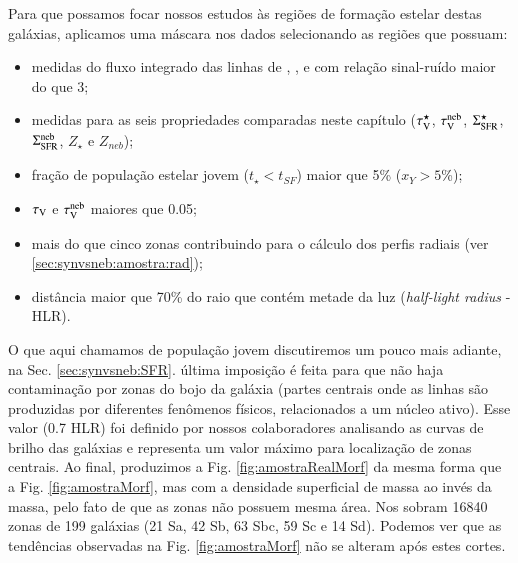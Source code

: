 Para que possamos focar nossos estudos às regiões de formação estelar destas galáxias, aplicamos uma
máscara nos dados selecionando as regiões que possuam:
\begin{itemize}
  \item medidas do fluxo integrado das linhas de \Halpha, \Hbeta, \nII e \oIII com relação
sinal-ruído maior do que 3;
  \item medidas para as seis propriedades comparadas neste capítulo ($\tau_{\mathrm{V}}^\star$, $\tau_{\mathrm{V}}^{\mathrm{neb}}$,
$\Sigma_{\mathrm{SFR}}^\star$, $\Sigma_{\mathrm{SFR}}^{\mathrm{neb}}$, $Z_\star$ e $Z_{neb}$);
  \item fração de população estelar jovem ($t_\star < t_{SF}$) maior que 5\% ($x_Y > 5$\%);
  \item $\tau_{\mathrm{V}}$ e $\tau_{\mathrm{V}}^{\mathrm{neb}}$ maiores que 0.05;
  \item mais do que cinco zonas contribuindo para o cálculo dos perfis radiais (ver
  \ref{sec:synvsneb:amostra:rad});
  \item distância maior que 70\% do raio que contém metade da luz ({\em half-light radius} - HLR).
\end{itemize}
\noindent O que aqui chamamos de população jovem discutiremos um pouco mais adiante, na Sec.
\ref{sec:synvsneb:SFR}. última imposição é feita para que não haja contaminação por zonas
do bojo da galáxia (partes centrais onde as linhas são produzidas por diferentes fenômenos físicos,
relacionados a um núcleo ativo). Esse valor (0.7 HLR) foi definido por nossos colaboradores
analisando as curvas de brilho das galáxias e representa um valor máximo para localização de zonas
centrais. \ojo Ao final, produzimos a Fig. \ref{fig:amostraRealMorf} da mesma forma que a
Fig. \ref{fig:amostraMorf}, mas com a densidade superficial de massa ao invés da massa, pelo fato de
que as zonas não possuem mesma área. Nos sobram 16840 zonas de 199 galáxias (21 Sa, 42 Sb, 63 Sbc,
59 Sc e 14 Sd). Podemos ver que as tendências observadas na Fig. \ref{fig:amostraMorf} não se
alteram após estes cortes.

